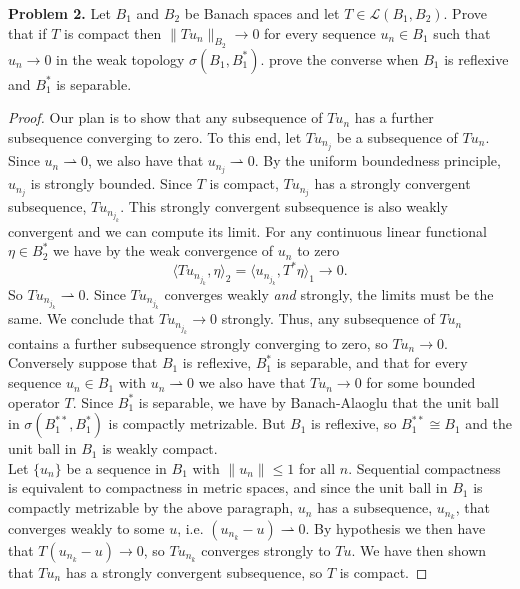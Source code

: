 \documentclass[11pt,letterpaper]{report}
\newcommand{\mcal}[1]{\mathcal{#1}}
\newcommand{\weak}{\rightharpoonup}
\begin{document}
\noindent\textbf{Problem 2. }Let $B_1$ and $B_2$ be Banach spaces and let $T\in \mcal{L}(B_1, B_2)$. Prove that if $T$ is compact then $\|Tu_n\|_{B_2}\to 0$ for every sequence $u_n\in B_1$ such that $u_n\to 0$ in the weak topology $\sigma(B_1, B_1^*)$. prove the converse when $B_1$ is reflexive and $B_1^*$ is separable.
\begin{proof}
	Our plan is to show that any subsequence of $Tu_n$ has a further subsequence converging to zero. To this end, let $Tu_{n_j}$ be a subsequence of $Tu_n$. Since $u_n \rightharpoonup 0$, we also have that $u_{n_j}\weak 0$. By the uniform boundedness principle, $u_{n_j}$ is strongly bounded. Since $T$ is compact, $Tu_{n_j}$ has a strongly convergent subsequence, $Tu_{n_{j_k}}$. This strongly convergent subsequence is also weakly convergent and we can compute its limit. For any continuous linear functional $\eta \in B_2^*$ we have by the weak convergence of $u_n$ to zero
	\[
	\langle Tu_{n_{j_k}}, \eta\rangle_2 = \langle u_{n_{j_k}}, T^*\eta\rangle_1 \to 0.
	\]
	So $Tu_{n_{j_k}}\weak 0$. Since $Tu_{n_{j_k}}$ converges weakly \textit{and} strongly, the limits must be the same. We conclude that $Tu_{n_{j_k}} \to 0$ strongly. Thus, any subsequence of $Tu_n$ contains a further subsequence strongly converging to zero, so $Tu_n \to 0$.\\

	\noindent Conversely suppose that $B_1$ is reflexive, $B_1^*$ is separable, and that for every sequence $u_n\in B_1$ with $u_n\weak 0$ we also have that $Tu_n\to 0$ for some bounded operator $T$. Since $B_1^*$ is separable, we have by Banach-Alaoglu that the unit ball in $\sigma(B_1^{**}, B_1^*)$ is compactly metrizable. But $B_1$ is reflexive, so $B_1^{**}\cong B_1$ and the unit ball in $B_1$ is weakly compact.\\

	\noindent Let $\{u_n\}$ be a sequence in $B_1$ with $\|u_n\|\leq 1$ for all $n$. Sequential compactness is equivalent to compactness in metric spaces, and since the unit ball in $B_1$ is compactly metrizable by the above paragraph, $u_n$ has a subsequence, $u_{n_k}$, that converges weakly to some $u$, i.e. $(u_{n_k} - u)\weak 0$. By hypothesis we then have that $T(u_{n_k} - u) \to 0$, so $Tu_{n_k}$ converges strongly to $Tu$. We have then shown that $Tu_n$ has a strongly convergent subsequence, so $T$ is compact.
\end{proof}
\end{document}
